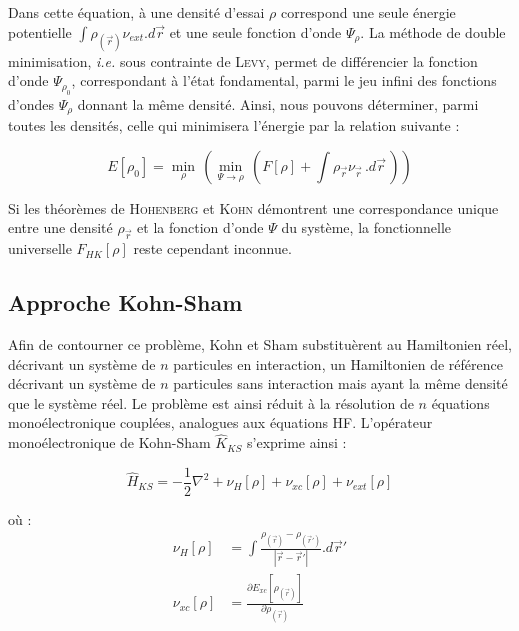 	Dans cette équation, à une densité d'essai $\rho$ correspond une seule énergie potentielle $\int \rho_{(\vec{r})} \nu_{ext} .d\vec{r}$ et une seule fonction d'onde $\Psi_{\rho}$. La méthode de double minimisation, \textit{i.e.} sous contrainte de \textsc{Levy}, permet de différencier la fonction d'onde $\Psi_{\rho_{0}}$, correspondant à l'état fondamental, parmi le jeu infini des fonctions d'ondes $\Psi_{\rho}$ donnant la même densité. Ainsi, nous pouvons déterminer, parmi toutes les densités, celle qui minimisera l'énergie par la relation suivante :
	
	\begin{equation}
	E[\rho_{0}] = \min\limits_{\rho}\, (\min\limits_{\Psi\rightarrow\rho}\, (F[\rho] + \int \rho_{\vec{r}} \nu_{\vec{r}}\, .d\vec{r}\, ))
	\end{equation}
	
	Si les théorèmes de \textsc{Hohenberg} et \textsc{Kohn} démontrent une correspondance unique entre une densité $\rho_{\vec{r}}$ et la fonction d'onde $\Psi$ du système, la fonctionnelle universelle $F_{HK}[\rho]$ reste cependant inconnue.
	
	\subsection{Approche Kohn-Sham}\label{Kohn-Sham}
	
	Afin de contourner ce problème, Kohn et Sham substituèrent au Hamiltonien réel, décrivant un système de $n$ particules en interaction, un Hamiltonien de référence décrivant un système de $n$ particules sans interaction mais ayant la même densité que le système réel. Le problème est ainsi réduit à la résolution de $n$ équations monoélectronique couplées, analogues aux équations HF. L'opérateur monoélectronique de Kohn-Sham $\hat{K}_{KS}$ s'exprime ainsi :
	
	\begin{equation}
	\hat{H}_{KS} = -\frac{1}{2} \nabla^{2} + \nu_{H}[\rho] + \nu_{xc}[\rho] + \nu_{ext}[\rho]
	\end{equation}
	
	\noindent où :
	\begin{align}
	\nu_{H}[\rho] &= \int \frac{\rho_{(\vec{r})} - \rho_{(\vec{r}')}}{|\vec{r} - \vec{r}'|} .d\vec{r}' \\
	\nu_{xc}[\rho] &= \frac{\partial E_{xc}[\rho_{(\vec{r})}]}{\partial\rho_{(\vec{r})}}
	\end{align}
	

